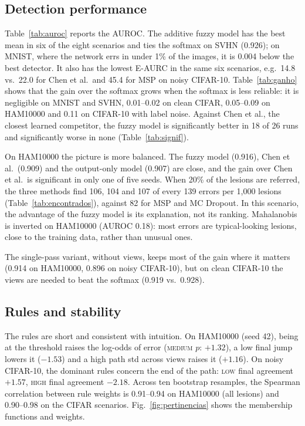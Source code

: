 \documentclass[conference,a4paper]{IEEEtran}
\newcommand{\term}[1]{\textsc{#1}}
\begin{document}
\subsection{Detection performance}
Table~\ref{tab:auroc} reports the AUROC. The additive fuzzy model has the best mean in six of the eight scenarios and ties the softmax
on SVHN (0.926); on MNIST, where the network errs in under 1\% of the images, it is 0.004 below the best detector. It also has the lowest
E-AURC in the same six scenarios, e.g.\ 14.8 vs.\ 22.0 for Chen et al.\ and 45.4 for MSP on noisy CIFAR-10.
Table~\ref{tab:ganho} shows that the gain over the softmax grows when the softmax is less reliable: it is negligible on MNIST and SVHN,
0.01--0.02 on clean CIFAR, 0.05--0.09 on HAM10000 and 0.11 on CIFAR-10 with label noise. Against Chen et al., the closest learned competitor,
the fuzzy model is significantly better in 18 of 26 runs and significantly worse in none (Table~\ref{tab:signif}).

On HAM10000 the picture is more balanced. The fuzzy model (0.916), Chen et al.\ (0.909) and the output-only model (0.907) are close,
and the gain over Chen et al.\ is significant in only one of five seeds. When 20\% of the lesions are referred, the three methods find
106, 104 and 107 of every 139 errors per 1,000 lesions (Table~\ref{tab:encontrados}), against 82 for MSP and MC Dropout. In this
scenario, the advantage of the fuzzy model is its explanation, not its ranking. Mahalanobis is inverted on HAM10000 (AUROC 0.18):
most errors are typical-looking lesions, close to the training data, rather than unusual ones.

The single-pass variant, without views, keeps most of the gain where it matters (0.914 on HAM10000, 0.896 on noisy CIFAR-10), but on
clean CIFAR-10 the views are needed to beat the softmax (0.919 vs.\ 0.928).

\subsection{Rules and stability}
The rules are short and consistent with intuition. On HAM10000 (seed 42), being at the threshold raises the log-odds of error
(\term{medium} $p$: $+1.32$), a low final jump lowers it ($-1.53$) and a high path std across views raises it ($+1.16$).
On noisy CIFAR-10, the dominant rules concern the end of the path: \term{low} final agreement $+1.57$, \term{high} final agreement $-2.18$.
Across ten bootstrap resamples, the Spearman correlation between rule weights is 0.91--0.94 on HAM10000 (all lesions) and 0.90--0.98
on the CIFAR scenarios. Fig.~\ref{fig:pertinencias} shows the membership functions and weights.
\end{document}
